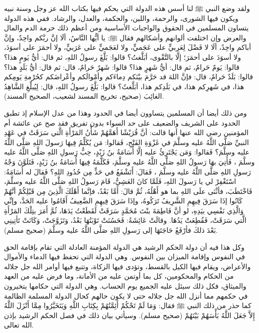 ولقد وضع النبي ﷺ لنا أسس هذه الدولة التي يحكم فيها بكتاب الله عز وجل وسنة نبيه ويكون فيها الشورى، والرحمة، واللين، والحكمة، والعدل، والرشاد. ففي هذه الدولة  يتساون المسلمين في الحقوق والواجبات الأساسية ومن أعظم ذلك حرمة الدم والمال والعرض وإن اختلفت ألوانهم وأشكالهم فقال ﷺ: يا أيُّها النَّاسُ، ألَا إنَّ ربَّكم واحِدٌ، وإنَّ أباكم واحِدٌ، ألَا لا فَضْلَ لِعَربيٍّ على عَجَميٍّ، ولا لعَجَميٍّ على عَرَبيٍّ، ولا أحمَرَ على أسوَدَ، ولا أسوَدَ على أحمَرَ؛ إلَّا بالتَّقْوى، أبَلَّغتُ؟ قالوا: بَلَّغَ رسولُ اللهِ، ثم قال: أيُّ يَومٍ هذا؟ قالوا: يَومٌ حَرامٌ، ثم قال: أيُّ شَهرٍ هذا؟ قالوا: شَهرٌ حَرامٌ، قال: ثم قال: أيُّ بَلَدٍ هذا؟ قالوا: بَلَدٌ حَرامٌ، قال: فإنَّ اللهَ قد حَرَّمَ بيْنَكم دِماءَكم وأمْوالَكم وأعْراضَكم كحُرْمةِ يَومِكم هذا، في شَهرِكم هذا، في بَلَدِكم هذا، أبَلَّغتُ؟ قالوا: بَلَّغَ رسولُ اللهِ، قال: لِيُبلِّغِ الشَّاهِدُ الغائِبَ {\footnotesize (صحيح، تخريج المسند لشعيب، الصحيح المسند)}.

ومن ذلك أيضا أن المسلمين يتساوون أيضا في الحدود وهذا من عدل الإسلام إذ تطبق الحدود على الشريف والضعيف على حد السواء بدون تفريق فقد صح عن عائشة أم المؤمنين رضي الله عنها أنها قالت: أنَّ قُرَيْشًا أَهَمَّهُمْ شَأْنُ المَرْأَةِ الَّتي سَرَقَتْ في عَهْدِ النبيِّ صَلَّى اللَّهُ عليه وسلَّمَ في غَزْوَةِ الفَتْحِ، فَقالوا: مَن يُكَلِّمُ فِيهَا رَسولَ اللهِ صَلَّى اللَّهُ عليه وسلَّمَ؟ فَقالوا: وَمَن يَجْتَرِئُ عليه إلَّا أُسَامَةُ بنُ زَيْدٍ، حِبُّ رَسولِ اللهِ صَلَّى اللَّهُ عليه وسلَّمَ ، فَأُتِيَ بهَا رَسولُ اللهِ صَلَّى اللَّهُ عليه وسلَّمَ، فَكَلَّمَهُ فِيهَا أُسَامَةُ بنُ زَيْدٍ، فَتَلَوَّنَ وَجْهُ رَسولِ اللهِ صَلَّى اللَّهُ عليه وسلَّمَ ، فَقالَ: أَتَشْفَعُ في حَدٍّ مِن حُدُودِ اللهِ؟ فَقالَ له أُسَامَةُ: اسْتَغْفِرْ لي يا رَسولَ اللهِ، فَلَمَّا كانَ العَشِيُّ، قَامَ رَسولُ اللهِ صَلَّى اللَّهُ عليه وسلَّمَ، فَاخْتَطَبَ، فأثْنَى علَى اللهِ بما هو أَهْلُهُ، ثُمَّ قالَ: أَمَّا بَعْدُ، فإنَّما أَهْلَكَ الَّذِينَ مِن قَبْلِكُمْ أنَّهُمْ كَانُوا إذَا سَرَقَ فِيهِمِ الشَّرِيفُ تَرَكُوهُ، وإذَا سَرَقَ فِيهِمِ الضَّعِيفُ أَقَامُوا عليه الحَدَّ، وإنِّي وَالَّذِي نَفْسِي بيَدِهِ، لو أنَّ فَاطِمَةَ بنْتَ مُحَمَّدٍ سَرَقَتْ لَقَطَعْتُ يَدَهَا، ثُمَّ أَمَرَ بتِلْكَ المَرْأَةِ الَّتي سَرَقَتْ، فَقُطِعَتْ يَدُهَا. وقالَتْ عَائِشَةُ: فَحَسُنَتْ تَوْبَتُهَا بَعْدُ، وَتَزَوَّجَتْ، وَكَانَتْ تَأتِينِي بَعْدَ ذلكَ فأرْفَعُ حَاجَتَهَا إلى رَسولِ اللهِ صَلَّى اللَّهُ عليه وسلَّمَ {\footnotesize (صحيح مسلم)}. 

وكل هذا فيه أن دولة الحكم الرشيد هي الدولة المؤمنة العادلة التي تقام بإقامة الحق في النفوس وإقامة الميزان بين النفوس. وهي الدولة التي تحفظ فيها الدماء والأموال والأعراض، ويقام فيها الكيل بالقسط، وتؤدى فيها الزكاة، وتتبع فيها أوامر الله جل جلاله من الحكام والمحكومين، كل بما أوتمن عليه من الأمانة، وما فرض عليه من العهد والميثاق، فكل ذلك سيئل عليه الجميع يوم الحساب. وهي الدولة التي حكامها يتخيرون في حكمهم مما أنزل الله جل جلاله حتى لا يكون حالهم كحال الدولة المسلمة الظالمة كما حذر من ذلك النبي ﷺ  فقال: وَمَا لَمْ تَحْكُمْ أَئِمَّتُهُمْ بِكِتَابِ اللَّهِ وَيَتَخَيَّرُوا مِمَّا أَنْزَلَ اللَّهُ إِلاَّ جَعَلَ اللَّهُ بَأْسَهُمْ بَيْنَهُمْ {\footnotesize (صحيح مسلم)}. وسيأتي بيان ذلك في فصل الحكم الرشيد بإذن الله تعالى.

